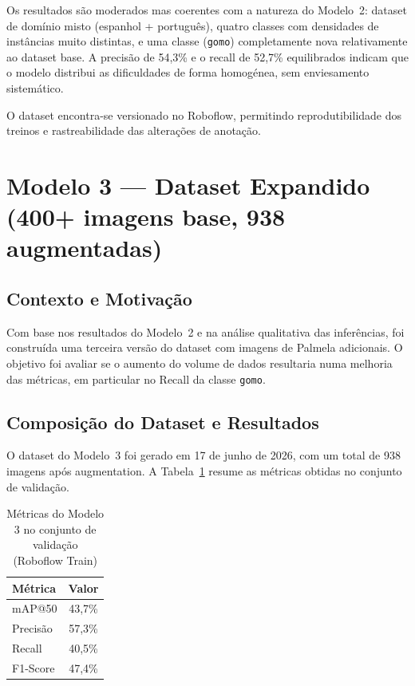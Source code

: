 Os resultados são moderados mas coerentes com a natureza do Modelo~2:
dataset de domínio misto (espanhol + português), quatro classes com
densidades de instâncias muito distintas, e uma classe (\texttt{gomo})
completamente nova relativamente ao dataset base. A precisão de 54,3\%
e o recall de 52,7\% equilibrados indicam que o modelo distribui as
dificuldades de forma homogénea, sem enviesamento sistemático.

O dataset encontra-se versionado no Roboflow, permitindo reprodutibilidade
dos treinos e rastreabilidade das alterações de anotação.

\section{Modelo 3 — Dataset Expandido (400+ imagens base, 938 augmentadas)}
\label{sec:modelo3}

\subsection{Contexto e Motivação}

Com base nos resultados do Modelo~2 e na análise qualitativa das
inferências, foi construída uma terceira versão do dataset com imagens
de Palmela adicionais. O objetivo foi avaliar se o aumento do volume de
dados resultaria numa melhoria das métricas, em particular no Recall da
classe \texttt{gomo}.

\subsection{Composição do Dataset e Resultados}

O dataset do Modelo~3 foi gerado em 17 de junho de 2026, com um total de
938 imagens após augmentation. A Tabela~\ref{tab:resultados_m3_dev}
resume as métricas obtidas no conjunto de validação.

\begin{table}[H]
  \centering
  \caption{Métricas do Modelo 3 no conjunto de validação (Roboflow Train)}
  \label{tab:resultados_m3_dev}
  \begin{tabular}{lc}
    \toprule
    \textbf{Métrica}   & \textbf{Valor} \\
    \midrule
    mAP@50             & 43,7\% \\
    Precisão           & 57,3\% \\
    Recall             & 40,5\% \\
    F1-Score           & 47,4\% \\
    \bottomrule
  \end{tabular}
\end{table}

